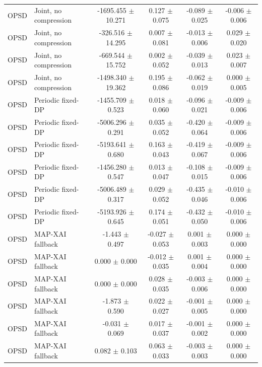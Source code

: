 \begin{table}[t]
\begin{tabular}{llcccc}
OPSD & Joint, no compression & -1695.455 $\pm$ 10.271 & 0.127 $\pm$ 0.075 & -0.089 $\pm$ 0.025 & -0.006 $\pm$ 0.006 \\
OPSD & Joint, no compression & -326.516 $\pm$ 14.295 & 0.007 $\pm$ 0.081 & -0.013 $\pm$ 0.006 & 0.029 $\pm$ 0.020 \\
OPSD & Joint, no compression & -669.544 $\pm$ 15.752 & 0.002 $\pm$ 0.052 & -0.039 $\pm$ 0.013 & 0.023 $\pm$ 0.007 \\
OPSD & Joint, no compression & -1498.340 $\pm$ 19.362 & 0.195 $\pm$ 0.086 & -0.062 $\pm$ 0.019 & 0.000 $\pm$ 0.005 \\
OPSD & Periodic fixed-DP & -1455.709 $\pm$ 0.523 & 0.018 $\pm$ 0.060 & -0.096 $\pm$ 0.021 & -0.009 $\pm$ 0.006 \\
OPSD & Periodic fixed-DP & -5006.296 $\pm$ 0.291 & 0.035 $\pm$ 0.052 & -0.420 $\pm$ 0.064 & -0.009 $\pm$ 0.006 \\
OPSD & Periodic fixed-DP & -5193.641 $\pm$ 0.680 & 0.163 $\pm$ 0.043 & -0.419 $\pm$ 0.067 & -0.009 $\pm$ 0.006 \\
OPSD & Periodic fixed-DP & -1456.280 $\pm$ 0.547 & 0.013 $\pm$ 0.047 & -0.108 $\pm$ 0.015 & -0.009 $\pm$ 0.006 \\
OPSD & Periodic fixed-DP & -5006.489 $\pm$ 0.317 & 0.029 $\pm$ 0.052 & -0.435 $\pm$ 0.046 & -0.010 $\pm$ 0.006 \\
OPSD & Periodic fixed-DP & -5193.926 $\pm$ 0.645 & 0.174 $\pm$ 0.051 & -0.432 $\pm$ 0.050 & -0.010 $\pm$ 0.006 \\
OPSD & MAP-XAI fallback & -1.443 $\pm$ 0.497 & -0.027 $\pm$ 0.053 & 0.001 $\pm$ 0.003 & 0.000 $\pm$ 0.000 \\
OPSD & MAP-XAI fallback & 0.000 $\pm$ 0.000 & -0.012 $\pm$ 0.035 & 0.001 $\pm$ 0.004 & 0.000 $\pm$ 0.000 \\
OPSD & MAP-XAI fallback & 0.000 $\pm$ 0.000 & 0.028 $\pm$ 0.035 & -0.003 $\pm$ 0.006 & 0.000 $\pm$ 0.000 \\
OPSD & MAP-XAI fallback & -1.873 $\pm$ 0.590 & 0.022 $\pm$ 0.027 & -0.001 $\pm$ 0.005 & 0.000 $\pm$ 0.000 \\
OPSD & MAP-XAI fallback & -0.031 $\pm$ 0.069 & 0.017 $\pm$ 0.037 & -0.001 $\pm$ 0.002 & 0.000 $\pm$ 0.000 \\
OPSD & MAP-XAI fallback & 0.082 $\pm$ 0.103 & 0.063 $\pm$ 0.033 & -0.003 $\pm$ 0.003 & 0.000 $\pm$ 0.000 \\
\bottomrule
\end{tabular}
\end{table}
